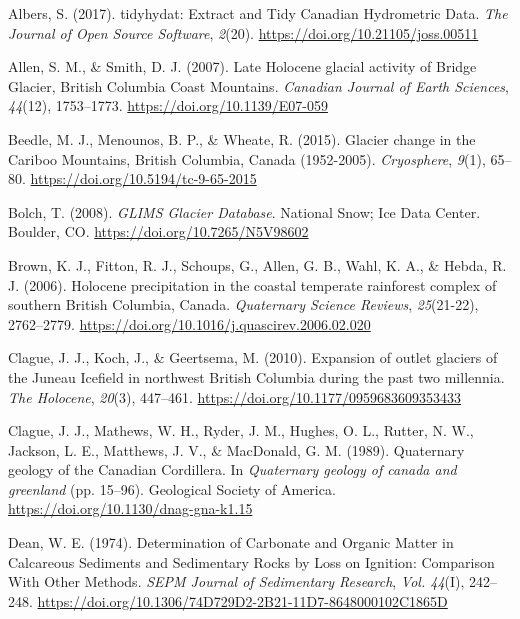 \documentclass[
  letterpaper,
  DIV=11,
  numbers=noendperiod]{scrartcl}
\newlength{\cslhangindent}
\newlength{\cslentryspacingunit} %
\newenvironment{CSLReferences}[2] %
 {%
  \setlength{\parindent}{0pt}
  \ifodd #1
  \let\oldpar\par
  \def\par{\hangindent=\cslhangindent\oldpar}
  \fi
  \setlength{\parskip}{#2\cslentryspacingunit}
 }%
 {}
\begin{document}
\hypertarget{refs}{}
\begin{CSLReferences}{1}{0}
\leavevmode{}%
Albers, S. (2017). {tidyhydat: Extract and Tidy Canadian Hydrometric
Data}. \emph{The Journal of Open Source Software}, \emph{2}(20).
\url{https://doi.org/10.21105/joss.00511}

\leavevmode{}%
Allen, S. M., \& Smith, D. J. (2007). {Late Holocene glacial activity of
Bridge Glacier, British Columbia Coast Mountains}. \emph{Canadian
Journal of Earth Sciences}, \emph{44}(12), 1753--1773.
\url{https://doi.org/10.1139/E07-059}

\leavevmode{}%
Beedle, M. J., Menounos, B. P., \& Wheate, R. (2015). {Glacier change in
the Cariboo Mountains, British Columbia, Canada (1952-2005)}.
\emph{Cryosphere}, \emph{9}(1), 65--80.
\url{https://doi.org/10.5194/tc-9-65-2015}

\leavevmode{}%
Bolch, T. (2008). \emph{{GLIMS Glacier Database}}. National Snow; Ice
Data Center. Boulder, CO. \url{https://doi.org/10.7265/N5V98602}

\leavevmode{}%
Brown, K. J., Fitton, R. J., Schoups, G., Allen, G. B., Wahl, K. A., \&
Hebda, R. J. (2006). {Holocene precipitation in the coastal temperate
rainforest complex of southern British Columbia, Canada}.
\emph{Quaternary Science Reviews}, \emph{25}(21-22), 2762--2779.
\url{https://doi.org/10.1016/j.quascirev.2006.02.020}

\leavevmode{}%
Clague, J. J., Koch, J., \& Geertsema, M. (2010). {Expansion of outlet
glaciers of the Juneau Icefield in northwest British Columbia during the
past two millennia}. \emph{The Holocene}, \emph{20}(3), 447--461.
\url{https://doi.org/10.1177/0959683609353433}

\leavevmode{}%
Clague, J. J., Mathews, W. H., Ryder, J. M., Hughes, O. L., Rutter, N.
W., Jackson, L. E., Matthews, J. V., \& MacDonald, G. M. (1989).
{Quaternary geology of the Canadian Cordillera}. In \emph{Quaternary
geology of canada and greenland} (pp. 15--96). Geological Society of
America. \url{https://doi.org/10.1130/dnag-gna-k1.15}

\leavevmode{}%
Dean, W. E. (1974). {Determination of Carbonate and Organic Matter in
Calcareous Sediments and Sedimentary Rocks by Loss on Ignition:
Comparison With Other Methods}. \emph{SEPM Journal of Sedimentary
Research}, \emph{Vol. 44}(I), 242--248.
\url{https://doi.org/10.1306/74D729D2-2B21-11D7-8648000102C1865D}


\end{CSLReferences}
\end{document}
